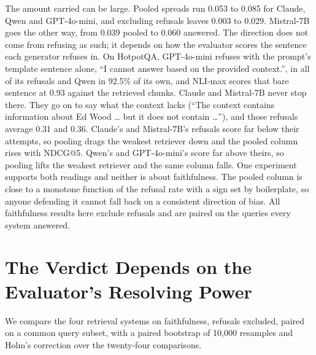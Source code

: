 \documentclass[11pt]{article}
\newcommand{\movableblock}[1]{}             %
\newcommand{\movableblock}[1]{}
\begin{document}
The amount carried can be large. Pooled spreads run 0.053 to 0.085 for Claude, Qwen and GPT-4o-mini, and excluding refusals leaves 0.003 to 0.029. Mistral-7B goes the other way, from 0.039 pooled to 0.060 answered. The direction does not come from refusing as such; it depends on how the evaluator scores the sentence each generator refuses in. On HotpotQA, GPT-4o-mini refuses with the prompt's template sentence alone, ``I cannot answer based on the provided context.'', in all of its refusals and Qwen in 92.5\% of its own, and NLI-max scores that bare sentence at 0.93 against the retrieved chunks. Claude and Mistral-7B never stop there. They go on to say what the context lacks (``The context contains information about Ed Wood \ldots{} but it does not contain \ldots''), and those refusals average 0.31 and 0.36. Claude's and Mistral-7B's refusals score far below their attempts, so pooling drags the weakest retriever down and the pooled column rises with NDCG@5. Qwen's and GPT-4o-mini's score far above theirs, so pooling lifts the weakest retriever and the same column falls. One experiment supports both readings and neither is about faithfulness. The pooled column is close to a monotone function of the refusal rate with a sign set by boilerplate, so anyone defending it cannot fall back on a consistent direction of bias. All faithfulness results here exclude refusals and are paired on the queries every system answered.


\movableblock{sections/graders}

\movableblock{sections/refusals}

\section{The Verdict Depends on the Evaluator's Resolving Power}
\label{sec:verdict}

We compare the four retrieval systems on faithfulness, refusals excluded, paired on a common query subset, with a paired bootstrap of 10,000 resamples and Holm's correction \citep{holm-1979} over the twenty-four comparisons.
\end{document}
